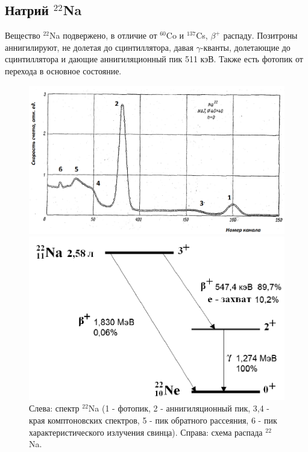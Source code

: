 \documentclass[12pt,a4paper]{article}
\begin{document}
	
	\subsection*{Натрий $^{22}$Na}
	
	Вещество $^{22}$Na подвержено, в отличие от $^{60}$Co и $^{137}$Cs, $\beta^{+}$ распаду. Позитроны аннигилируют, не долетая до сцинтиллятора, давая $\gamma$-кванты, долетающие до сцинтиллятора и дающие аннигиляционный пик 511 кэВ. Также есть фотопик от перехода в основное состояние.
	
	\begin{figure}[H]
		\centering
		\begin{minipage}{0.55\textwidth}
			\centering
			\includegraphics[width=0.9\linewidth]{res/na_spectre.png}
		\end{minipage}%
		\begin{minipage}{0.45\textwidth}
			\centering
			\includegraphics[width=1.0\linewidth]{res/na_levels.png}
		\end{minipage}
		\caption{\centering
			Слева: спектр $^{22}$Na (1 - фотопик, 2 - аннигиляционный пик, 3,4 - края комптоновских спектров, 5 - пик обратного рассеяния, 6 - пик характеристического излучения свинца). \newline
			Справа: схема распада $^{22}$Na.}
		\label{fig:na_scheme}
	\end{figure}
	
\end{document}
